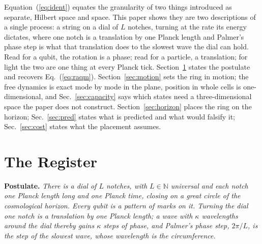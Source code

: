 \documentclass[aps,prd,twocolumn,superscriptaddress,nofootinbib]{revtex4-2}
\begin{document}
Equation~(\ref{eq:ident}) equates the granularity of two things introduced as separate, Hilbert space and space. This paper shows they are two descriptions of a single process: a string on a dial of $L$ notches, turning at the rate its energy dictates, where one notch is a translation by one Planck length and Palmer's phase step is what that translation does to the slowest wave the dial can hold. Read for a qubit, the rotation is a phase; read for a particle, a translation; for light the two are one thing at every Planck tick. Section~\ref{sec:register} states the postulate and recovers Eq.~(\ref{eq:raqm}). Section~\ref{sec:motion} sets the ring in motion; the free dynamics is exact mode by mode in the plane, position in whole cells is one-dimensional, and Sec.~\ref{sec:capacity} says which states need a three-dimensional space the paper does not construct. Section~\ref{sec:horizon} places the ring on the horizon; Sec.~\ref{sec:pred} states what is predicted and what would falsify it; Sec.~\ref{sec:cost} states what the placement assumes.

\section{The Register}
\label{sec:register}

\textbf{Postulate.} \emph{There is a dial of $L$ notches, with $L\in\mathbb{N}$ universal and each notch one Planck length long and one Planck time, closing on a great circle of the cosmological horizon. Every qubit is a pattern of marks on it. Turning the dial one notch is a translation by one Planck length; a wave with $\kappa$ wavelengths around the dial thereby gains $\kappa$ steps of phase, and Palmer's phase step, $2\pi/L$, is the step of the slowest wave, whose wavelength is the circumference.}
\end{document}

